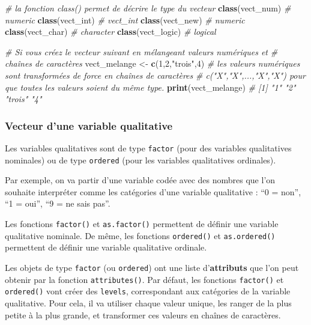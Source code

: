 \documentclass[
]{book}
\newenvironment{Shaded}{\begin{snugshade}}{\end{snugshade}}
\newcommand{\CommentTok}[1]{\textcolor[rgb]{0.56,0.35,0.01}{\textit{#1}}}
\newcommand{\DecValTok}[1]{\textcolor[rgb]{0.00,0.00,0.81}{#1}}
\newcommand{\FunctionTok}[1]{\textcolor[rgb]{0.13,0.29,0.53}{\textbf{#1}}}
\newcommand{\NormalTok}[1]{#1}
\newcommand{\OtherTok}[1]{\textcolor[rgb]{0.56,0.35,0.01}{#1}}
\newcommand{\StringTok}[1]{\textcolor[rgb]{0.31,0.60,0.02}{#1}}
\begin{document}
\begin{Shaded}
\begin{Highlighting}[]
\CommentTok{\# la fonction class() permet de décrire le type du vecteur}
\FunctionTok{class}\NormalTok{(vect\_num) }\CommentTok{\# numeric}
\FunctionTok{class}\NormalTok{(vect\_int) }\CommentTok{\# vect\_int}
\FunctionTok{class}\NormalTok{(vect\_new) }\CommentTok{\# numeric}
\FunctionTok{class}\NormalTok{(vect\_char) }\CommentTok{\# character}
\FunctionTok{class}\NormalTok{(vect\_logic) }\CommentTok{\# logical}

\CommentTok{\# Si vous créez le vecteur suivant en mélangeant valeurs numériques et }
\CommentTok{\# chaînes de caractères}
\NormalTok{vect\_melange }\OtherTok{\textless{}{-}} \FunctionTok{c}\NormalTok{(}\DecValTok{1}\NormalTok{,}\DecValTok{2}\NormalTok{,}\StringTok{"trois"}\NormalTok{,}\DecValTok{4}\NormalTok{)}
\CommentTok{\# les valeurs numériques sont transformées de force en chaînes de caractères }
\CommentTok{\# c("X","X",...,"X","X") pour que toutes les valeurs soient du même type.}
\FunctionTok{print}\NormalTok{(vect\_melange)}
\CommentTok{\# [1] "1"     "2"     "trois" "4"}
\end{Highlighting}
\end{Shaded}

\subsubsection{Vecteur d'une variable qualitative}\label{vecteur-dune-variable-qualitative}

Les variables qualitatives sont de type \texttt{factor} (pour des variables qualitatives nominales) ou de type \texttt{ordered} (pour les variables qualitatives ordinales).

Par exemple, on va partir d'une variable codée avec des nombres que l'on souhaite interpréter comme les catégories d'une variable qualitative : ``0 = non'', ``1 = oui'', ``9 = ne sais pas''.

Les fonctions \texttt{factor()} et \texttt{as.factor()} permettent de définir une variable qualitative nominale. De même, les fonctions \texttt{ordered()} et \texttt{as.ordered()} permettent de définir une variable qualitative ordinale.

Les objets de type \texttt{factor} (ou \texttt{ordered}) ont une liste d'\textbf{attributs} que l'on peut obtenir par la fonction \texttt{attributes()}.
Par défaut, les fonctions \texttt{factor()} et \texttt{ordered()} vont créer des \texttt{levels}, correspondant aux catégories de la variable qualitative. Pour cela, il va utiliser chaque valeur unique, les ranger de la plus petite à la plus grande, et transformer ces valeurs en chaînes de caractères.
\end{document}
